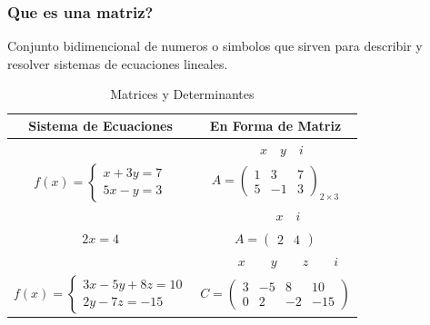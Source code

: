 \documentclass[stu, 12pt, letterpaper, donotrepeattitle, floatsintext, natbib]{apa7}
\begin{document}
    \subsubsection{Que es una matriz?}
    Conjunto bidimencional de numeros o simbolos que sirven para describir y resolver sistemas de ecuaciones lineales.
    \begin{table}
        \centering
        \begin{tabular}{|c|c|}
            \hline
            Sistema de Ecuaciones & En Forma de Matriz \\ \hline
            & $\quad x\quad y\quad i$ \\
            $ f(x) =  \begin{cases}
                          x + 3y = 7 \\ 5x - y = 3
            \end{cases} $
            &
            $A = \begin{pmatrix}
                     1 & 3  & 7 \\
                     5 & -1 & 3
            \end{pmatrix}_{2\times3}$ \\[1cm]\hline

            & $\quad\quad\quad x\quad i\quad $ \\
            $2x=4$ & $A = \begin{pmatrix}
                              2 & 4
            \end{pmatrix}$ \\[0.8cm]\hline

            & $\quad\quad x\quad\quad y\quad\quad z\quad\quad i$ \\
            $ f(x)=\begin{cases}
                       3x-5y+8z=10 \\ 2y-7z=-15
            \end{cases} $ &
            $C=\begin{pmatrix}
                   3 & -5 & 8  & 10  \\
                   0 & 2  & -2 & -15
            \end{pmatrix}$ \\[1cm]\hline
        \end{tabular}\label{tab:table}
        \caption{Matrices y Determinantes}
    \end{table}
\end{document}
